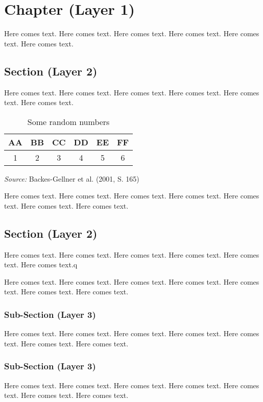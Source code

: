 \chapter{Chapter (Layer 1)}

Here comes text. Here comes text. Here comes text. Here comes text. Here comes text. Here comes text.

\section{Section (Layer 2)}

Here comes text. Here comes text. Here comes text. Here comes text. Here comes text. Here comes text.

\begin{table}[H]
    \centering
    \captionsetup{font=bf}
    \caption{Some random numbers}
    \begin{tabular}{|c|c|c|c|c|c|}
        \hline
        \textbf{AA} & \textbf{BB} & \textbf{CC} & \textbf{DD} & \textbf{EE} & \textbf{FF} \\
        \hline
        1 & 2 & 3 & 4 & 5 & 6 \\
        \hline
    \end{tabular}
    \label{tab:mytable}
    \begin{tablenotes}
        \centering
        \item \textit{Source:} Backes-Gellner et al. (2001, S. 165)
    \end{tablenotes}
\end{table}

Here comes text. Here comes text. Here comes text. Here comes text. Here comes text. Here comes text. Here comes text.

\section{Section (Layer 2)}

Here comes text. Here comes text. Here comes text. Here comes text. Here comes text. Here comes text.q


Here comes text. Here comes text. Here comes text. Here comes text. Here comes text. Here comes text. Here comes text.

\subsection{Sub-Section (Layer 3)}

Here comes text. Here comes text. Here comes text. Here comes text. Here comes text. Here comes text. Here comes text.

\subsection{Sub-Section (Layer 3)}

Here comes text. Here comes text. Here comes text. Here comes text. Here comes text. Here comes text. Here comes text.